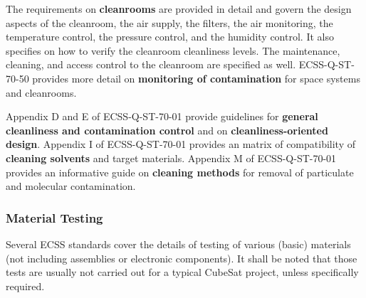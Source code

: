 The requirements on \textbf{cleanrooms} are provided in detail and govern the design aspects of the cleanroom, the air supply, the filters, the air monitoring, the temperature control, the pressure control, and the humidity control. It also specifies on how to verify the cleanroom cleanliness levels. The maintenance, cleaning, and access control to the cleanroom are specified as well. ECSS-Q-ST-70-50 \cite{ECSS-Q-ST-70-50} provides more detail on \textbf{monitoring of contamination} for space systems and cleanrooms.

Appendix D and E of ECSS-Q-ST-70-01 provide guidelines for \textbf{general cleanliness and contamination control} and on \textbf{cleanliness-oriented design}. Appendix I of ECSS-Q-ST-70-01 provides an matrix of compatibility of \textbf{cleaning solvents} and target materials. Appendix M of ECSS-Q-ST-70-01 provides an informative guide on \textbf{cleaning methods} for removal of particulate and molecular contamination.

\subsubsection{Material Testing}

Several ECSS standards cover the details of testing of various (basic) materials (not including assemblies or electronic components). It shall be noted that those tests are usually not carried out for a typical CubeSat project, unless specifically required.

